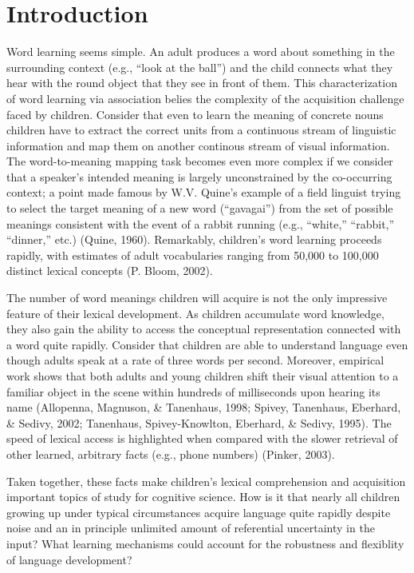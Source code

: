\documentclass[oneside]{report}
\begin{document}
\afterpreface


\chapter*{Introduction}\label{intro}

Word learning seems simple. An adult produces a word about something in
the surrounding context (e.g., ``look at the ball'') and the child
connects what they hear with the round object that they see in front of
them. This characterization of word learning via association belies the
complexity of the acquisition challenge faced by children. Consider that
even to learn the meaning of concrete nouns children have to extract the
correct units from a continuous stream of linguistic information and map
them on another continous stream of visual information. The
word-to-meaning mapping task becomes even more complex if we consider
that a speaker's intended meaning is largely unconstrained by the
co-occurring context; a point made famous by W.V. Quine's example of a
field linguist trying to select the target meaning of a new word
(``gavagai'') from the set of possible meanings consistent with the
event of a rabbit running (e.g., ``white,'' ``rabbit,'' ``dinner,''
etc.) (Quine, 1960). Remarkably, children's word learning proceeds
rapidly, with estimates of adult vocabularies ranging from 50,000 to
100,000 distinct lexical concepts (P. Bloom, 2002).

The number of word meanings children will acquire is not the only
impressive feature of their lexical development. As children accumulate
word knowledge, they also gain the ability to access the conceptual
representation connected with a word quite rapidly. Consider that
children are able to understand language even though adults speak at a
rate of three words per second. Moreover, empirical work shows that both
adults and young children shift their visual attention to a familiar
object in the scene within hundreds of milliseconds upon hearing its
name (Allopenna, Magnuson, \& Tanenhaus, 1998; Spivey, Tanenhaus,
Eberhard, \& Sedivy, 2002; Tanenhaus, Spivey-Knowlton, Eberhard, \&
Sedivy, 1995). The speed of lexical access is highlighted when compared
with the slower retrieval of other learned, arbitrary facts (e.g., phone
numbers) (Pinker, 2003).

Taken together, these facts make children's lexical comprehension and
acquisition important topics of study for cognitive science. How is it
that nearly all children growing up under typical circumstances acquire
language quite rapidly despite noise and an in principle unlimited
amount of referential uncertainty in the input? What learning mechanisms
could account for the robustness and flexiblity of language development?
\end{document}
